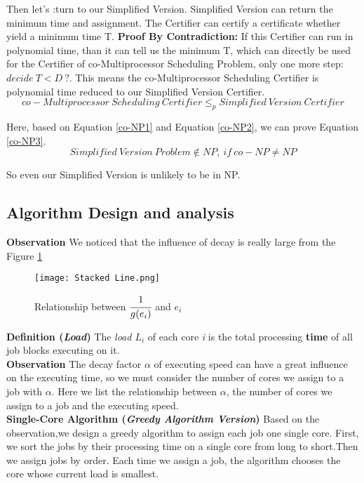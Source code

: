 \documentclass{article}
\begin{document}
Then let's :turn to our Simplified Version.
Simplified Version can return the minimum time and assignment. The Certifier can certify a certificate whether yield a minimum time T. 
\textbf{Proof By Contradiction:} If this Certifier can run in polynomial time, than it can tell us the minimum T, which can directly be used for the Certifier of co-Multiprocessor Scheduling Problem, only one more step: $decide\ T<D\ ?$. This means the co-Multiprocessor Scheduling Certifier is polynomial time reduced to our Simplified Version Certifier.
\begin{equation}
    co-Multiprocessor\ Scheduling\ Certifier \leq_p Simplified\ Version\ Certifier
    \label{co-NP2}
\end{equation}

Here, based on Equation \ref{co-NP1} and Equation \ref{co-NP2}, we can prove Equation \ref{co-NP3}.
\begin{equation}
    Simplified\ Version\ Problem \notin NP,\ if\ co-NP \neq NP
    \label{co-NP3}
\end{equation}

So even our Simplified Version is unlikely to be in NP.

\subsection{Algorithm Design and  analysis}
    \textbf{Observation} We noticed that the influence of decay is really large from the Figure \ref{line}
    \begin{figure}[H]
        \centering
        \texttt{[image: Stacked Line.png]}
        \caption{Relationship between $\cfrac{1}{g(e_i)}$ and $e_i$}
        \label{line}
    \end{figure}
    \textbf{Definition (\textit{Load})} The \textit{load $L_i$} of each core \textit{i} is the total processing \textbf{time} of all job blocks executing on it. \\
    
    \textbf{Observation} The decay factor $\alpha$ of executing speed can have a great influence on the executing time, so we must consider the number of cores we assign to a job with $\alpha$. Here we list the relationship between $\alpha$, the number of cores we assign to a job and the executing speed. \\
    
    
    
    \textbf{Single-Core Algorithm (\textit{Greedy Algorithm Version})} Based on the observation,we design a greedy algorithm to assign each job one single core. First, we sort the jobs by their processing time on a single core from long to short.Then we assign jobs by order. Each time we assign a job, the algorithm chooses the core whose current load is smallest.
    
\end{document}
